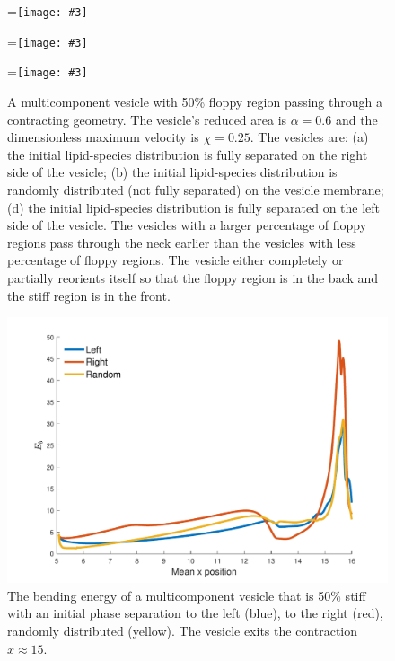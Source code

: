 \documentclass[twoside,twocolumn,9pt]{article}
\newcommand{\subfigimg}[3][,]{%
  \setbox1=\hbox{\texttt{[image: \#3]}}%
  \leavevmode\rlap{\usebox1}%
  \rlap{\hspace*{0pt}\raisebox{\dimexpr\ht1-0\baselineskip}{\bf
  \normalsize #2}}%
  \phantom{\usebox1}%
}
\begin{document}
\begin{figure}[H]
    \centering
    \subfigimg[width=\columnwidth,trim ={5cm .5cm 2cm .5cm},clip]{(a)}{figures/rightSep.pdf}
    \subfigimg[width=\columnwidth,trim ={5cm .5cm 2cm .5cm},clip]{(b)}{figures/randSep.pdf}
    \subfigimg[width=\columnwidth,trim ={5cm .5cm 2cm .5cm},clip]{(c)}{figures/leftSep.pdf}
     \caption{\label{fig:RA6leftRightRand} \small A multicomponent vesicle with 50\% floppy region passing through a contracting geometry. The vesicle's reduced area is $\alpha = 0.6$ and the dimensionless maximum velocity is $\chi = 0.25$. The vesicles are: (a) the initial lipid-species distribution is fully separated on the right side of the vesicle; (b) the initial lipid-species distribution is randomly distributed (not fully separated) on the vesicle membrane; (d) the initial lipid-species distribution is fully separated on the left side of the vesicle. The vesicles with a larger percentage of floppy regions pass through the neck earlier than the vesicles with less percentage of floppy regions. The vesicle either completely or partially reorients itself so that the floppy region is in the back and the stiff region is in the front.}
\end{figure}

\begin{figure}[H]
    \centering
    \includegraphics[width=\columnwidth]{figures/bending_leftRightRand.pdf}
    \caption{The bending energy of a multicomponent vesicle that is 50\% stiff with an initial phase separation to the left (blue), to the right (red), randomly distributed (yellow). The vesicle exits the contraction $x \approx 15$.}
    \label{fig:RAp6leftRightRandBending}
\end{figure}
\end{document}
